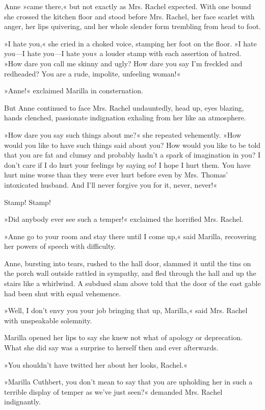 Anne »came there,« but not exactly as Mrs. Rachel expected. With one bound she crossed the kitchen floor and stood before Mrs. Rachel, her face scarlet with anger, her lips quivering, and her whole slender form trembling from head to foot.

»I hate you,« she cried in a choked voice, stamping her foot on the floor. »I hate you—I hate you—I hate you\longdash« a louder stamp with each assertion of hatred. »How dare you call me skinny and ugly? How dare you say I’m freckled and redheaded? You are a rude, impolite, unfeeling woman!«

»Anne!« exclaimed Marilla in consternation.

But Anne continued to face Mrs. Rachel undauntedly, head up, eyes blazing, hands clenched, passionate indignation exhaling from her like an atmosphere.

»How dare you say such things about me?« she repeated vehemently. »How would you like to have such things said about you? How would you like to be told that you are fat and clumsy and probably hadn’t a spark of imagination in you? I don’t care if I do hurt your feelings by saying so! I hope I hurt them. You have hurt mine worse than they were ever hurt before even by Mrs. Thomas’ intoxicated husband. And I’ll never forgive you for it, never, never!«

Stamp! Stamp!

»Did anybody ever see such a temper!« exclaimed the horrified Mrs. Rachel.

»Anne go to your room and stay there until I come up,« said Marilla, recovering her powers of speech with difficulty.

Anne, bursting into tears, rushed to the hall door, slammed it until the tins on the porch wall outside rattled in sympathy, and fled through the hall and up the stairs like a whirlwind. A subdued slam above told that the door of the east gable had been shut with equal vehemence.

»Well, I don’t envy you your job bringing that up, Marilla,« said Mrs. Rachel with unspeakable solemnity.

Marilla opened her lips to say she knew not what of apology or deprecation. What she did say was a surprise to herself then and ever afterwards.

»You shouldn’t have twitted her about her looks, Rachel.«

»Marilla Cuthbert, you don’t mean to say that you are upholding her in such a terrible display of temper as we’ve just seen?« demanded Mrs. Rachel indignantly.

